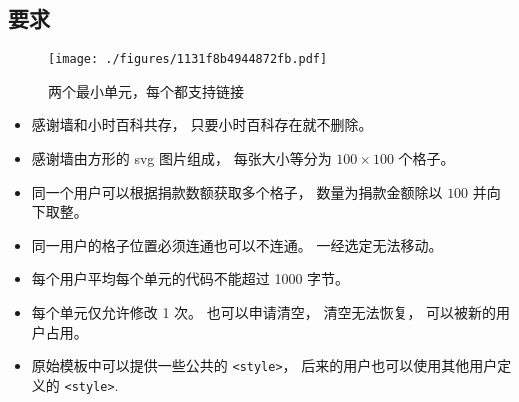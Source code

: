 
\subsection{要求}

\begin{figure}[ht]
\centering
\texttt{[image: ./figures/1131f8b4944872fb.pdf]}
\caption{两个最小单元，每个都支持链接} \label{fig_thanks_1}
\end{figure}

\begin{itemize}
\item 感谢墙和小时百科共存， 只要小时百科存在就不删除。
\item 感谢墙由方形的 svg 图片组成， 每张大小等分为 $100\times 100$ 个格子。
\item 同一个用户可以根据捐款数额获取多个格子， 数量为捐款金额除以 $100$ 并向下取整。
\item 同一用户的格子位置必须连通也可以不连通。 一经选定无法移动。
\item 每个用户平均每个单元的代码不能超过 1000 字节。
\item 每个单元仅允许修改 1 次。 也可以申请清空， 清空无法恢复， 可以被新的用户占用。
\item 原始模板中可以提供一些公共的 \verb`<style>`， 后来的用户也可以使用其他用户定义的 \verb`<style>`.
\end{itemize}

